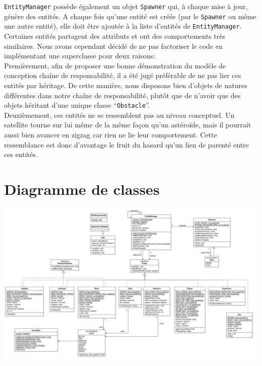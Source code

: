 \documentclass[11pt,a4paper,twoside,svgnames]{article}
\begin{document}
\texttt{EntityManager} possède également un objet \texttt{Spawner} qui, à chaque mise à jour, génère des entités. A chaque fois qu'une entité est créée (par le \texttt{Spawner} ou même une autre entité), elle doit être ajoutée à la liste d'entités de \texttt{EntityManager}.\\

Certaines entités partagent des attributs et ont des comportements très similaires. Nous avons cependant décidé de ne pas factoriser le code en implémentant une superclasse pour deux raisons:\\

Premièrement, afin de proposer une bonne démonstration du modèle de conception chaîne de responsabilité, il a été jugé préférable de ne pas lier ces entités par héritage. De cette manière, nous disposons bien d'objets de natures différentes dans notre chaîne de responsabilité, plutôt que de n'avoir que des objets héritant d'une unique classe ``\texttt{Obstacle}''.\\

Deuxièmement, ces entités ne se ressemblent pas au niveau conceptuel. Un satellite tourne sur lui même de la même façon qu'un astéroïde, mais il pourrait aussi bien avancer en zigzag car rien ne lie leur comportement. Cette ressemblance est donc d'avantage le fruit du hasard qu'un lien de parenté entre ces entités.

\section{Diagramme de classes}

\includegraphics[width=\paperwidth,height=\paperheight,keepaspectratio,angle=90,origin=c]{uml_cor.jpg}

\clearpage
\end{document}
